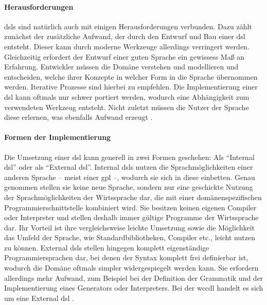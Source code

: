     \paragraph{Herausforderungen}
    \glspl{dsl} sind natürlich auch mit einigen Herausforderungen verbunden.
    Dazu zählt zunächst der zusätzliche Aufwand, der durch den Entwurf und Bau einer \gls{dsl} entsteht.
    Dieser kann durch moderne Werkzeuge allerdings verringert werden.
    Gleichzeitig erfordert der Entwurf einer guten Sprache ein gewissess Maß an Erfahrung.
    Entwickler müssen die Domäne verstehen und modellieren und entscheiden,
    welche ihrer Konzepte in welcher Form in die Sprache übernommen werden.
    Iterative Prozesse sind hierbei zu empfehlen.
    Die Implementierung einer \gls{dsl} kann oftmals nur schwer portiert werden,
    wodurch eine Abhängigkeit zum verwendeten Werkzeug entsteht.
    Nicht zuletzt müssen die Nutzer der Sprache diese erlernen,
    was ebenfalls Aufwand erzeugt
    \cite[Kapitel 2.6]{voelter:DslEngineering}.

    \paragraph{Formen der Implementierung}
    Die Umsetzung einer \gls{dsl} kann generell in zwei Formen geschehen:
    Als "`Internal \gls{dsl}"' oder als "`External \gls{dsl}"'.
    Internal \glspl{dsl} nutzen die Sprachmöglichkeiten einer anderen Sprache
    -- meist einer \gls{gpl} --, wodurch sie sich in diese einbetten.
    Genau genommen stellen sie keine neue Sprache,
    sondern nur eine geschickte Nutzung der Sprachmöglichkeiten
    der Wirtssprache dar, die mit einer domänenspezifischen Programmierschnittstelle kombiniert wird.
    Sie besitzen keinen eigenen Compiler oder Interpreter und stellen deshalb immer gültige Programme
    der Wirtssprache dar.
    Ihr Vorteil ist ihre vergleichsweise leichte Umsetzung sowie die Möglichkeit das Umfeld der Sprache,
    wie Standardbibliotheken, Compiler etc., leicht nutzen zu können.
    External \glspl{dsl} stellen hingegen komplett eigenständige Programmiersprachen dar,
    bei denen der Syntax komplett frei definierbar ist,
    wodurch die Domäne oftmals simpler widergespiegelt werden kann.
    Sie erfordern allerdings mehr Aufwand, zum Beispiel bei der Definition der Grammatik
    und der Implementierung eines Generators oder Interpreters.
    Bei der \gls{wccdl} handelt es sich um eine External \gls{dsl}
    \cite[Kapitel 2.8.1]{voelter:DslEngineering}.

